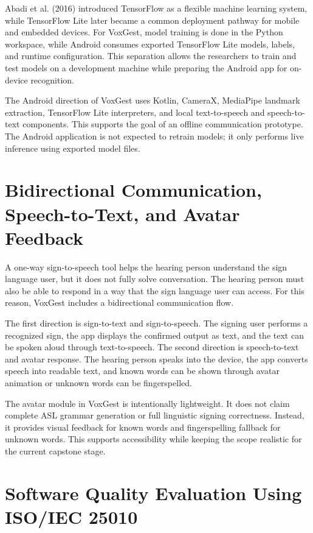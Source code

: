 Abadi et al. (2016) introduced TensorFlow as a flexible machine learning system, while TensorFlow Lite later became a common deployment pathway for mobile and embedded devices. For VoxGest, model training is done in the Python workspace, while Android consumes exported TensorFlow Lite models, labels, and runtime configuration. This separation allows the researchers to train and test models on a development machine while preparing the Android app for on-device recognition.

The Android direction of VoxGest uses Kotlin, CameraX, MediaPipe landmark extraction, TensorFlow Lite interpreters, and local text-to-speech and speech-to-text components. This supports the goal of an offline communication prototype. The Android application is not expected to retrain models; it only performs live inference using exported model files.

\section{Bidirectional Communication, Speech-to-Text, and Avatar Feedback}

A one-way sign-to-speech tool helps the hearing person understand the sign language user, but it does not fully solve conversation. The hearing person must also be able to respond in a way that the sign language user can access. For this reason, VoxGest includes a bidirectional communication flow.

The first direction is sign-to-text and sign-to-speech. The signing user performs a recognized sign, the app displays the confirmed output as text, and the text can be spoken aloud through text-to-speech. The second direction is speech-to-text and avatar response. The hearing person speaks into the device, the app converts speech into readable text, and known words can be shown through avatar animation or unknown words can be fingerspelled.

The avatar module in VoxGest is intentionally lightweight. It does not claim complete ASL grammar generation or full linguistic signing correctness. Instead, it provides visual feedback for known words and fingerspelling fallback for unknown words. This supports accessibility while keeping the scope realistic for the current capstone stage.

\section{Software Quality Evaluation Using ISO/IEC 25010}

